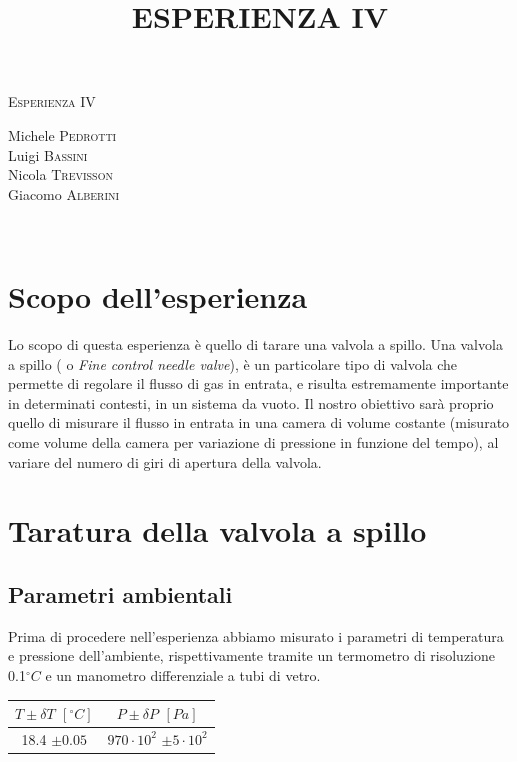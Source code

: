 \documentclass[a4paper,11pt]{article}
\begin{document}
\begin{center}



\textsc{\Huge Esperienza IV}\\[0.5cm]



\large
\title{ESPERIENZA IV}

Michele \textsc{Pedrotti}\\
Luigi \textsc{Bassini}\\
Nicola \textsc{Trevisson}\\
Giacomo \textsc{Alberini}






\end{center}


~\\
\section{Scopo dell'esperienza}
Lo scopo di questa esperienza è quello di tarare una valvola a spillo. Una valvola a spillo ( o \textit{Fine control needle valve}), è un particolare tipo di valvola che permette di regolare il flusso di gas in entrata, e risulta estremamente importante in determinati contesti, in un sistema da vuoto. Il nostro obiettivo sarà proprio quello di misurare il flusso in entrata in una camera di volume costante (misurato come volume della camera per variazione di pressione in funzione del tempo), al variare del numero di giri di apertura della valvola.


\section{Taratura della valvola a spillo}
\subsection{Parametri ambientali}
Prima di procedere nell'esperienza abbiamo misurato i parametri di temperatura e pressione dell'ambiente, rispettivamente tramite un termometro di risoluzione 0.1$^\circ C$ e un manometro differenziale a tubi di vetro.
\begin{center}
 \begin{tabular}{|c|c|}
\hline $T \pm \delta T$ $[^\circ C]$ & $P \pm \delta P$ $[Pa]$ \\ 
\hline 18.4 $\pm 0.05$  & $970\cdot 10^{2}$ $\pm 5\cdot 10^{2}$ \\ 
\hline 
\end{tabular} 
\end{center}
\end{document}
